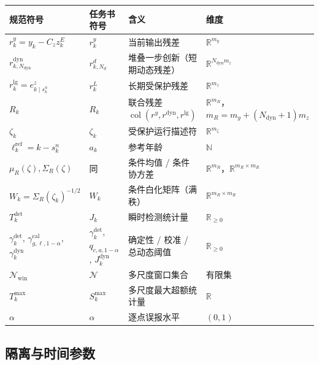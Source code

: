 \documentclass[11pt,a4paper]{ctexart}
\theoremstyle{remark}
\newcommand{\col}{\operatorname{col}}
\newcommand{\R}{\mathbb{R}}
\begin{document}
\begin{longtable}{L{0.28\textwidth}L{0.12\textwidth}L{0.32\textwidth}L{0.16\textwidth}}
\toprule
规范符号 & 任务书符号 & 含义 & 维度 \\
\midrule
\endhead
$r^y_k=y_k-C_zz^E_k$ & $r_k^y$ & 当前输出残差 & $\R^{m_y}$ \\
$r^{\mathrm{dyn}}_{k,N_{\mathrm{dyn}}}$ & $r_{k,N_d}^d$ & 堆叠一步创新（短期动态残差） & $\R^{N_{\mathrm{dyn}}m_z}$ \\
$r^{\mathrm{lg}}_k=e^z_{k\mid s^n_k}$ & $r_k^L$ & 长期受保护残差 & $\R^{m_z}$ \\
$R_k$ & $R_k$ & 联合残差 $\col(r^y,r^{\mathrm{dyn}},r^{\mathrm{lg}})$ & $\R^{m_R}$，$m_R=m_y+(N_{\mathrm{dyn}}{+}1)m_z$ \\
$\zeta_k$ & $\zeta_k$ & 受保护运行描述符 & $\R^{m_\zeta}$ \\
$\ell^{\mathrm{ref}}_k=k-s^n_k$ & $a_k$ & 参考年龄 & $\mathbb N$ \\
$\mu_R(\zeta),\Sigma_R(\zeta)$ & 同 & 条件均值 / 条件协方差 & $\R^{m_R}$，$\R^{m_R\times m_R}$ \\
$W_k=\Sigma_R(\zeta_k)^{-1/2}$ & $W_k$ & 条件白化矩阵（满秩） & $\R^{m_R\times m_R}$ \\
$T^{\mathrm{det}}_k$ & $J_k$ & 瞬时检测统计量 & $\R_{\ge0}$ \\
$\gamma^{\mathrm{det}}_k$, $\gamma^{\mathrm{cal}}_{g,\ell,1-\alpha}$, $\gamma^{\mathrm{dyn}}_k$ & $\gamma_k^{\mathrm{det}}$, $q_{c,a,1-\alpha}$, $J_k^{\mathrm{dyn}}$ & 确定性 / 校准 / 总动态阈值 & $\R_{\ge0}$ \\
$\mathcal N_{\mathrm{win}}$ & $\mathcal N$ & 多尺度窗口集合 & 有限集 \\
$T^{\max}_k$ & $S_k^{\max}$ & 多尺度最大超额统计量 & $\R$ \\
$\alpha$ & $\alpha$ & 逐点误报水平 & $(0,1)$ \\
\bottomrule
\end{longtable}

\subsection{隔离与时间参数}
\end{document}
